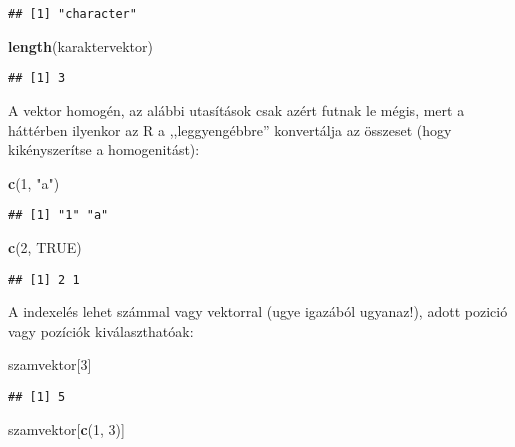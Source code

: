 \documentclass[]{book}
\newenvironment{Shaded}{\begin{snugshade}}{\end{snugshade}}
\newcommand{\KeywordTok}[1]{\textcolor[rgb]{0.13,0.29,0.53}{\textbf{#1}}}
\newcommand{\DecValTok}[1]{\textcolor[rgb]{0.00,0.00,0.81}{#1}}
\newcommand{\StringTok}[1]{\textcolor[rgb]{0.31,0.60,0.02}{#1}}
\newcommand{\OtherTok}[1]{\textcolor[rgb]{0.56,0.35,0.01}{#1}}
\newcommand{\NormalTok}[1]{#1}
\begin{document}
\begin{verbatim}
## [1] "character"
\end{verbatim}

\begin{Shaded}
\begin{Highlighting}[]
\KeywordTok{length}\NormalTok{(karaktervektor)}
\end{Highlighting}
\end{Shaded}

\begin{verbatim}
## [1] 3
\end{verbatim}

A vektor homogén, az alábbi utasítások csak azért futnak le mégis, mert
a háttérben ilyenkor az R a ,,leggyengébbre'' konvertálja az összeset
(hogy kikényszerítse a homogenitást):

\begin{Shaded}
\begin{Highlighting}[]
\KeywordTok{c}\NormalTok{(}\DecValTok{1}\NormalTok{, }\StringTok{"a"}\NormalTok{)}
\end{Highlighting}
\end{Shaded}

\begin{verbatim}
## [1] "1" "a"
\end{verbatim}

\begin{Shaded}
\begin{Highlighting}[]
\KeywordTok{c}\NormalTok{(}\DecValTok{2}\NormalTok{, }\OtherTok{TRUE}\NormalTok{)}
\end{Highlighting}
\end{Shaded}

\begin{verbatim}
## [1] 2 1
\end{verbatim}

A indexelés lehet számmal vagy vektorral (ugye igazából ugyanaz!), adott
pozició vagy pozíciók kiválaszthatóak:

\begin{Shaded}
\begin{Highlighting}[]
\NormalTok{szamvektor[}\DecValTok{3}\NormalTok{]}
\end{Highlighting}
\end{Shaded}

\begin{verbatim}
## [1] 5
\end{verbatim}

\begin{Shaded}
\begin{Highlighting}[]
\NormalTok{szamvektor[}\KeywordTok{c}\NormalTok{(}\DecValTok{1}\NormalTok{, }\DecValTok{3}\NormalTok{)]}
\end{Highlighting}
\end{Shaded}
\end{document}
